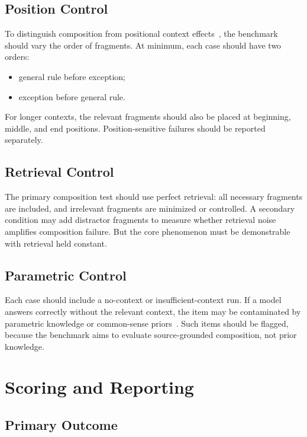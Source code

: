 \documentclass[11pt]{article}
\begin{document}
\subsection{Position Control}

To distinguish composition from positional context effects~\cite{liu2024lost}, the benchmark should vary the order of fragments. At minimum, each case should have two orders:

\begin{itemize}[leftmargin=*,itemsep=2pt]
    \item general rule before exception;
    \item exception before general rule.
\end{itemize}

For longer contexts, the relevant fragments should also be placed at beginning, middle, and end positions. Position-sensitive failures should be reported separately.

\subsection{Retrieval Control}

The primary composition test should use perfect retrieval: all necessary fragments are included, and irrelevant fragments are minimized or controlled. A secondary condition may add distractor fragments to measure whether retrieval noise amplifies composition failure. But the core phenomenon must be demonstrable with retrieval held constant.

\subsection{Parametric Control}

Each case should include a no-context or insufficient-context run. If a model answers correctly without the relevant context, the item may be contaminated by parametric knowledge or common-sense priors~\cite{lin2022truthfulqa}. Such items should be flagged, because the benchmark aims to evaluate source-grounded composition, not prior knowledge.

\section{Scoring and Reporting}

\subsection{Primary Outcome}
\end{document}
